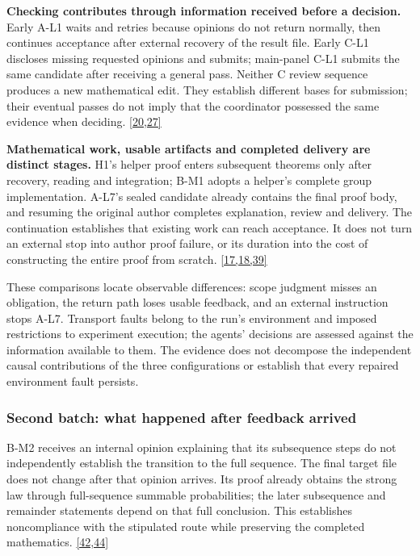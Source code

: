 \textbf{Checking contributes through information received before a decision.} Early A-L1 waits and retries because opinions do not return normally, then continues acceptance after external recovery of the result file. Early C-L1 discloses missing requested opinions and submits; main-panel C-L1 submits the same candidate after receiving a general pass. Neither C review sequence produces a new mathematical edit. They establish different bases for submission; their eventual passes do not imply that the coordinator possessed the same evidence when deciding. \href{en.pdf\#ref-20}{\mbox{[20,27]}}

\textbf{Mathematical work, usable artifacts and completed delivery are distinct stages.} H1's helper proof enters subsequent theorems only after recovery, reading and integration; B-M1 adopts a helper's complete group implementation. A-L7's sealed candidate already contains the final proof body, and resuming the original author completes explanation, review and delivery. The continuation establishes that existing work can reach acceptance. It does not turn an external stop into author proof failure, or its duration into the cost of constructing the entire proof from scratch. \href{en.pdf\#ref-17}{\mbox{[17,18,39]}}

These comparisons locate observable differences: scope judgment misses an obligation, the return path loses usable feedback, and an external instruction stops A-L7. Transport faults belong to the run's environment and imposed restrictions to experiment execution; the agents' decisions are assessed against the information available to them. The evidence does not decompose the independent causal contributions of the three configurations or establish that every repaired environment fault persists.

\subsubsection[Second batch: what happened after feedback arrived]{\texorpdfstring{\protect\hypertarget{r2-8}{}Second batch: what happened after feedback arrived}{Second batch: what happened after feedback arrived}}
B-M2 receives an internal opinion explaining that its subsequence steps do not independently establish the transition to the full sequence. The final target file does not change after that opinion arrives. Its proof already obtains the strong law through full-sequence summable probabilities; the later subsequence and remainder statements depend on that full conclusion. This establishes noncompliance with the stipulated route while preserving the completed mathematics. \href{en.pdf\#ref-42}{\mbox{[42,44]}}


